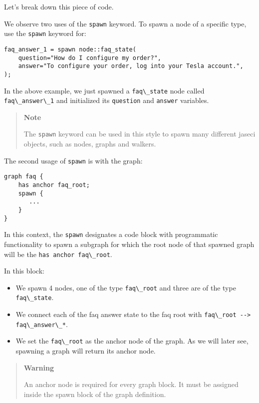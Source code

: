 Let's break down this piece of code.

We observe two uses of the \passthrough{\lstinline!spawn!} keyword. To
spawn a node of a specific type, use the \passthrough{\lstinline!spawn!}
keyword for:

\begin{lstlisting}
faq_answer_1 = spawn node::faq_state(
    question="How do I configure my order?",
    answer="To configure your order, log into your Tesla account.",
);
\end{lstlisting}

In the above example, we just spawned a
\passthrough{\lstinline!faq\_state!} node called
\passthrough{\lstinline!faq\_answer\_1!} and initialized its
\passthrough{\lstinline!question!} and \passthrough{\lstinline!answer!}
variables.

\begin{quote}
\textbf{Note}

The \passthrough{\lstinline!spawn!} keyword can be used in this style to
spawn many different jaseci objects, such as nodes, graphs and walkers.
\end{quote}

The second usage of \passthrough{\lstinline!spawn!} is with the graph:

\begin{lstlisting}
graph faq {
    has anchor faq_root;
    spawn {
       ...
    }
}
\end{lstlisting}

In this context, the \passthrough{\lstinline!spawn!} designates a code
block with programmatic functionality to spawn a subgraph for which the
root node of that spawned graph will be the
\passthrough{\lstinline!has anchor faq\_root!}.

In this block:

\begin{itemize}
\tightlist
\item
  We spawn 4 nodes, one of the type \passthrough{\lstinline!faq\_root!}
  and three are of the type \passthrough{\lstinline!faq\_state!}.
\item
  We connect each of the faq answer state to the faq root with
  \passthrough{\lstinline!faq\_root --> faq\_answer\_*!}.
\item
  We set the \passthrough{\lstinline!faq\_root!} as the anchor node of
  the graph. As we will later see, spawning a graph will return its
  anchor node.
\end{itemize}

\begin{quote}
\textbf{Warning}

An anchor node is required for every graph block. It must be assigned
inside the spawn block of the graph definition.
\end{quote}

